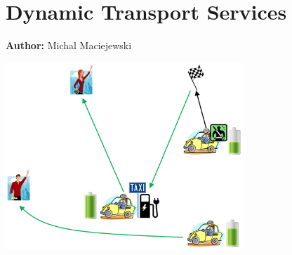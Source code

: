\chapter{Dynamic Transport Services}
\label{ch:dts}

\hfill \textbf{Author:} Michal Maciejewski

\begin{center} \includegraphics[width=0.67\textwidth, angle=0]{extending/figures/DTS/eTaxiDispMatsimBook.png} \end{center}


\createStandardInformationBasic%
{}%
{}%
{\configNonstd}%
{
\citet{MaciejewskiNagelOnlineTaxis2, MaciejewskiNagel2013OnlineTaxisVSPWP, MaciejewskiNagel2013CooperationPPAM, Maciejewski2014OnlineViaOffline}
}


